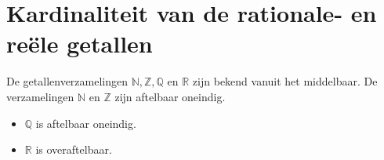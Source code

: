 \section{Kardinaliteit van de rationale- en reële getallen}
De getallenverzamelingen $\mathbb{N}, \mathbb{Z}, \mathbb{Q}$ en $\mathbb{R}$ zijn bekend vanuit het middelbaar.
De verzamelingen $\mathbb{N}$ en $\mathbb{Z}$ zijn aftelbaar oneindig.
\begin{itemize}
    \item $\mathbb{Q}$ is aftelbaar oneindig.
    \item $\mathbb{R}$ is overaftelbaar.
\end{itemize}
